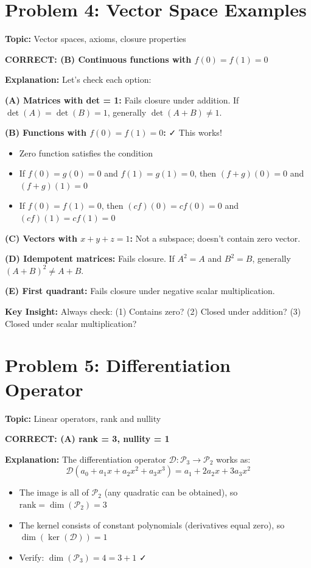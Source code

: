 \documentclass[12pt]{amsart}
\newcommand{\correct}[1]{{\color{blue}\textbf{CORRECT: #1}}}
\newcommand{\hint}{\textbf{Key Insight: }}
\begin{document}
\hrulefill

\section*{Problem 4: Vector Space Examples}
\textbf{Topic:} Vector spaces, axioms, closure properties

\correct{(B) Continuous functions with $f(0) = f(1) = 0$}

\textbf{Explanation:} Let's check each option:

\textbf{(A) Matrices with det = 1:} Fails closure under addition. If $\det(A) = \det(B) = 1$, generally $\det(A+B) \neq 1$.

\textbf{(B) Functions with $f(0) = f(1) = 0$:} ✓ This works!
\begin{itemize}
\item Zero function satisfies the condition
\item If $f(0) = g(0) = 0$ and $f(1) = g(1) = 0$, then $(f+g)(0) = 0$ and $(f+g)(1) = 0$
\item If $f(0) = f(1) = 0$, then $(cf)(0) = cf(0) = 0$ and $(cf)(1) = cf(1) = 0$
\end{itemize}

\textbf{(C) Vectors with $x+y+z=1$:} Not a subspace; doesn't contain zero vector.

\textbf{(D) Idempotent matrices:} Fails closure. If $A^2 = A$ and $B^2 = B$, generally $(A+B)^2 \neq A+B$.

\textbf{(E) First quadrant:} Fails closure under negative scalar multiplication.

\hint Always check: (1) Contains zero? (2) Closed under addition? (3) Closed under scalar multiplication?

\hrulefill

\section*{Problem 5: Differentiation Operator}
\textbf{Topic:} Linear operators, rank and nullity

\correct{(A) rank = 3, nullity = 1}

\textbf{Explanation:} The differentiation operator $\mathcal{D}: \mathcal{P}_3 \to \mathcal{P}_2$ works as:
$$\mathcal{D}(a_0 + a_1x + a_2x^2 + a_3x^3) = a_1 + 2a_2x + 3a_3x^2$$

\begin{itemize}
\item The image is all of $\mathcal{P}_2$ (any quadratic can be obtained), so $\text{rank} = \dim(\mathcal{P}_2) = 3$
\item The kernel consists of constant polynomials (derivatives equal zero), so $\dim(\ker(\mathcal{D})) = 1$
\item Verify: $\dim(\mathcal{P}_3) = 4 = 3 + 1$ ✓
\end{itemize}
\end{document}

